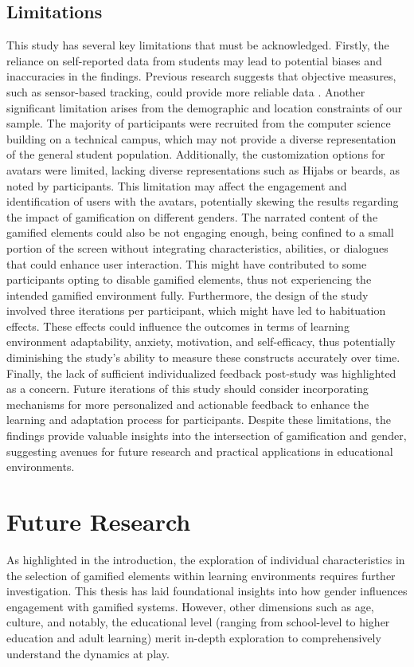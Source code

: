\subsection{Limitations}
This study has several key limitations that must be acknowledged. Firstly, the reliance on self-reported data from students may lead to potential biases and inaccuracies in the findings. Previous research suggests that objective measures, such as sensor-based tracking, could provide more reliable data \parencite{woolfAffectiveTutorsAutomatic2010}.
Another significant limitation arises from the demographic and location constraints of our sample. The majority of participants were recruited from the computer science building on a technical campus, which may not provide a diverse representation of the general student population.
Additionally, the customization options for avatars were limited, lacking diverse representations such as Hijabs or beards, as noted by participants. This limitation may affect the engagement and identification of users with the avatars, potentially skewing the results regarding the impact of gamification on different genders.
The narrated content of the gamified elements could also be not engaging enough, being confined to a small portion of the screen without integrating characteristics, abilities, or dialogues that could enhance user interaction. This might have contributed to some participants opting to disable gamified elements, thus not experiencing the intended gamified environment fully.
Furthermore, the design of the study involved three iterations per participant, which might have led to habituation effects. These effects could influence the outcomes in terms of learning environment adaptability, anxiety, motivation, and self-efficacy, thus potentially diminishing the study's ability to measure these constructs accurately over time.
Finally, the lack of sufficient individualized feedback post-study was highlighted as a concern. Future iterations of this study should consider incorporating mechanisms for more personalized and actionable feedback to enhance the learning and adaptation process for participants.
Despite these limitations, the findings provide valuable insights into the intersection of gamification and gender, suggesting avenues for future research and practical applications in educational environments.

\section{Future Research}
As highlighted in the introduction, the exploration of individual characteristics in the selection of gamified elements within learning environments requires further investigation. This thesis has laid foundational insights into how gender influences engagement with gamified systems. However, other dimensions such as age, culture, and notably, the educational level (ranging from school-level to higher education and adult learning) merit in-depth exploration to comprehensively understand the dynamics at play.

